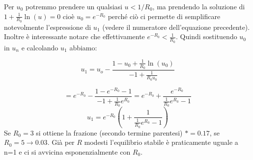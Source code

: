 \documentclass[Main.tex]{subfiles}
\begin{document}
\begin{appendic}
Per $u_0$ potremmo prendere un qualsiasi $u<1/R_0$, ma prendendo la soluzione di $1 + \frac{1}{R_0} \ln(u)=0$ cioè $u_0=e^{-R_0}$ perché ciò ci permette di semplificare notevolmente l'espressione di $u_1$ (vedere il numeratore dell'equazione precedente). Inoltre è interessante notare che effettivamente $e^{-R_0}<\frac{1}{R_0}$. Quindi sostituendo $u_0$ in $u_n$ e calcolando $u_1$ abbiamo:

\begin{equation}
  u_1 = u_o - \frac{1- u_0 + \frac{1}{R_0} \ln (u_0)}{-1 + \frac{1}{R_0 u_0}}
\end{equation}

\begin{equation}
  = e^{-R_0}- \frac{1- e^{-R_0}-1}{-1 + \frac{1}{R_0} e^{R_0}}= e^{-R_0}+ \frac{e^{-R_0}}{\frac{1}{R_0} e^{R_0} -1}
\end{equation}
\begin{equation}
  u_1 = e^{-R_0} \left(1+ \frac{1}{\frac{1}{R_0} e^{R_0} -1} \right)
\end{equation}
Se $R_0=3$ si ottiene la frazione (secondo termine parentesi) $*=0.17$, se $R_0 = 5 \rightarrow 0.03$. Già per $R$ modesti l'equilibrio stabile è praticamente uguale a n=1 e ci si avvicina esponenzialmente con $R_0$.	
\end{appendic}





\newpage
{}
\end{document}
